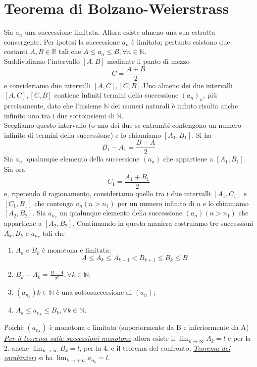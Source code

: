 \documentclass{article}
\begin{document}
\section{Teorema di Bolzano-Weierstrass}
Sia $a_n$ una successione limitata. Allora esiste almeno una sua estratta convergente.
Per ipotesi la successione $a_n$ è limitata; pertanto esistono due costanti $A,B \in \mathbb{R}$ tali che $A \leq a_n \leq B, \forall n \in \mathbb{N}$.
\\ Suddividiamo l'intervallo $[A,B]$ mediante il punto di mezzo $$C=\frac{A+B}{2}$$ e consideriamo due intervalli $[A,C], [C,B]$.Uno almeno dei due intervalli $[A,C], [C,B]$ contiene infiniti termini della successione $(a_n)_n$, più precisamente, 
dato che l'insieme $\mathbb{N}$ dei numeri naturali è infinto risulta anche infinito uno tra i due sottoinsiemi di $\mathbb{N}$.
\\ Scegliamo questo intervallo (o uno dei due se entrambi contengono un numero infinito di termini della successione) e lo chiamiamo $[A_1, B_1]$. Si ha
$$B_1-A_1=\frac{B-A}{2}$$
Sia $a_{n_1}$ qualunque elemento della successione $(a_n)$ che appartiene a $[A_1, B_1]$. Sia ora
$$C_1=\frac{A_1+B_1}{2}$$
e, ripetendo il ragionamento, consideriamo quello tra i due intervalli $[A_1, C_1]$ e $[C_1, B_1]$ che contenga $a_n (n > n_1)$ per un numero infinito di $n$ e lo chiamiamo
$[A_2, B_2]$. Sia $a_{n_2}$ un qualunque elemento della successione $(a_n) (n > n_1)$ che appartiene a $[A_2, B_2]$.
Continuando in questa maniera costruiamo tre successioni $A_k, B_k$ e $a_{n_k}$ tali che
\begin{enumerate}
    \item $A_k$ e $B_k$ è monotona e limitata;
    $$A \leq A_k \leq A_{k+1} < B_{k+1} \leq B_k \leq B$$
    \item $B_k - A_k = \frac{B-A}{2^k}, \forall k \in \mathbb{N}$;
    \item $(a_{n_k}) k \in \mathbb{N}$ è una sottosuccessione di $(a_n)$;
    \item $A_k \leq a_{n_k} \leq B_k, \forall k \in \mathbb{N}$.
\end{enumerate}
Poichè $(a_{n_k})$ è monotona e limitata (superiormente da B e inferiormente da A) \underline{\textit {Per il teorema sulle successioni monotone}}
allora esiste il $\lim_{k \to \infty}A_k = l$ e per la 2. anche $\lim_{k \to \infty}B_k = l$, per la 4. e il teorema del confronto, \underline{\textit {Teorema dei carabinieri}} si ha $\lim_{k \to +\infty}a_{n_k} = l$.
\end{document}
